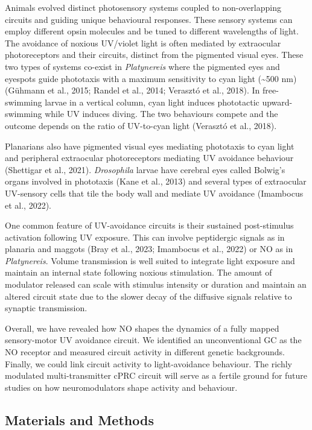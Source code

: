 \documentclass[
  11pt,
  letterpaper,
  DIV=11,
  numbers=noendperiod]{scrartcl}
\begin{document}
Animals evolved distinct photosensory systems coupled to non-overlapping
circuits and guiding unique behavioural responses. These sensory systems
can employ different opsin molecules and be tuned to different
wavelengths of light. The avoidance of noxious UV/violet light is often
mediated by extraocular photoreceptors and their circuits, distinct from
the pigmented visual eyes. These two types of systems co-exist in
\emph{Platynereis} where the pigmented eyes and eyespots guide
phototaxis with a maximum sensitivity to cyan light (\textasciitilde500
nm) (Gühmann et al., 2015; Randel et al., 2014; Verasztó et al., 2018).
In free-swimming larvae in a vertical column, cyan light induces
phototactic upward-swimming while UV induces diving. The two behaviours
compete and the outcome depends on the ratio of UV-to-cyan light
(Verasztó et al., 2018).

Planarians also have pigmented visual eyes mediating phototaxis to cyan
light and peripheral extraocular photoreceptors mediating UV avoidance
behaviour (Shettigar et al., 2021). \emph{Drosophila} larvae have
cerebral eyes called Bolwig's organs involved in phototaxis (Kane et
al., 2013) and several types of extraocular UV-sensory cells that tile
the body wall and mediate UV avoidance (Imambocus et al., 2022).

One common feature of UV-avoidance circuits is their sustained
post-stimulus activation following UV exposure. This can involve
peptidergic signals as in planaria and maggots (Bray et al., 2023;
Imambocus et al., 2022) or NO as in \emph{Platynereis}. Volume
transmission is well suited to integrate light exposure and maintain an
internal state following noxious stimulation. The amount of modulator
released can scale with stimulus intensity or duration and maintain an
altered circuit state due to the slower decay of the diffusive signals
relative to synaptic transmission.

Overall, we have revealed how NO shapes the dynamics of a fully mapped
sensory-motor UV avoidance circuit. We identified an unconventional GC
as the NO receptor and measured circuit activity in different genetic
backgrounds. Finally, we could link circuit activity to light-avoidance
behaviour. The richly modulated multi-transmitter cPRC circuit will
serve as a fertile ground for future studies on how neuromodulators
shape activity and behaviour.

\subsection{Materials and Methods}\label{materials-and-methods}
\end{document}
